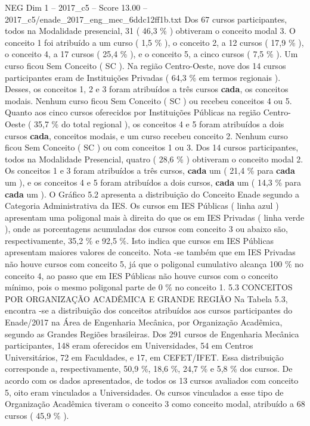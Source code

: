 \begin{textsample}{NEG Dim 1 – 2017\_c5 – Score 13.00 – 2017\_c5/enade\_2017\_eng\_mec\_6ddc12ff1b.txt}
Dos 67 cursos participantes, todos na Modalidade presencial, 31 ( 46,3 \% ) obtiveram o conceito modal 3.
O conceito 1 foi atribuído a um curso ( 1,5 \% ), o conceito 2, a 12 cursos ( 17,9 \% ), o conceito 4, a 17 cursos ( 25,4 \% ), e o conceito 5, a cinco cursos ( 7,5 \% ).
Um curso ficou Sem Conceito ( SC ).
Na região Centro-Oeste, nove dos 14 cursos participantes eram de Instituições Privadas ( 64,3 \% em termos regionais ).
Desses, os conceitos 1, 2 e 3 foram atribuídos a três cursos \textbf{cada}, os conceitos modais.
Nenhum curso ficou Sem Conceito ( SC ) ou recebeu conceitos 4 ou 5.
Quanto aos cinco cursos oferecidos por Instituições Públicas na região Centro-Oeste ( 35,7 \% do total regional ), os conceitos 4 e 5 foram atribuídos a dois cursos \textbf{cada}, conceitos modais, e um curso recebeu conceito 2.
Nenhum curso ficou Sem Conceito ( SC ) ou com conceitos 1 ou 3.
Dos 14 cursos participantes, todos na Modalidade Presencial, quatro ( 28,6 \% ) obtiveram o conceito modal 2.
Os conceitos 1 e 3 foram atribuídos a três cursos, \textbf{cada} um ( 21,4 \% para \textbf{cada} um ), e os conceitos 4 e 5 foram atribuídos a dois cursos, \textbf{cada} um ( 14,3 \% para \textbf{cada} um ).
O Gráfico 5.2 apresenta a distribuição do Conceito Enade segundo a Categoria Administrativa da IES.
Os cursos em IES Públicas ( linha azul ) apresentam uma poligonal mais à direita do que os em IES Privadas ( linha verde ), onde as porcentagens acumuladas dos cursos com conceito 3 ou abaixo são, respectivamente, 35,2 \% e 92,5 \%.
Isto indica que cursos em IES Públicas apresentam maiores valores de conceito.
Nota -se também que em IES Privadas não houve cursos com conceito 5, já que o poligonal cumulativo alcança 100 \% no conceito 4, ao passo que em IES Públicas não houve cursos com o conceito mínimo, pois o mesmo poligonal parte de 0 \% no conceito 1. 5.3 CONCEITOS POR ORGANIZAÇÃO ACADÊMICA E GRANDE REGIÃO Na Tabela 5.3, encontra -se a distribuição dos conceitos atribuídos aos cursos participantes do Enade/2017 na Área de Engenharia Mecânica, por Organização Acadêmica, segundo as Grandes Regiões brasileiras.
Dos 291 cursos de Engenharia Mecânica participantes, 148 eram oferecidos em Universidades, 54 em Centros Universitários, 72 em Faculdades, e 17, em CEFET/IFET.
Essa distribuição corresponde a, respectivamente, 50,9 \%, 18,6 \%, 24,7 \% e 5,8 \% dos cursos.
De acordo com os dados apresentados, de todos os 13 cursos avaliados com conceito 5, oito eram vinculados a Universidades.
Os cursos vinculados a esse tipo de Organização Acadêmica tiveram o conceito 3 como conceito modal, atribuído a 68 cursos ( 45,9 \% ).

\end{textsample}

